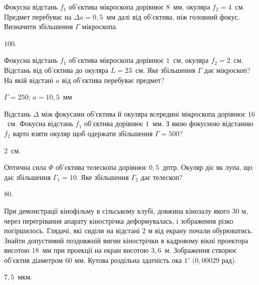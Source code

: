 \begin{problem}%
Фокусна відстань $f_1$ об'єктива мікроскопа дорівнює $8$~мм, окуляра $f_2 =
	4$~см. Предмет перебуває на $\Delta a = 0,5$~мм далі від об'єктива, ніж головний
фокус. Визначити збільшення $\Gamma$ мікроскопа.
\begin{solution}
	$100$.
\end{solution}
\end{problem}


\begin{problem}%
Фокусна відстань $f_1$ об'єктива мікроскопа дорівнює $1$~см, окуляра $f_2 =
	2$~см. Відстань від об'єктива до окуляра $L = 23$~см. Яке збільшення $\Gamma$ дає
мікроскоп? На якій відстані $a$ від об'єктива перебуває предмет?
\begin{solution}
	$\Gamma = 250$; $a = 10,5$~мм
\end{solution}
\end{problem}

\begin{problem}%
Відстань $\Delta$ між фокусами об'єктива й окуляра всередині мікроскопа
дорівнює $16$~см. Фокусна відстань $f_1$ об'єктива дорівнює $1$~мм. З якою
фокусною відстанню $f_2$ варто взяти окуляр щоб одержати збільшення $\Gamma  = 500$?
\begin{solution}
	$2$~см.
\end{solution}
\end{problem}

\begin{problem}%
Оптична сила $\Phi$ об'єктива телескопа дорівнює $0,5$~дптр. Окуляр діє
як лупа, що дає збільшення $\Gamma_1 = 10$. Яке збільшення $\Gamma_2$ дає телескоп?
\begin{solution}
	$80$.
\end{solution}
\end{problem}


\begin{problem}%
При демонстрації кінофільму в сільському клубі, довжина кінозалу
якого $30$ м, через перегрівання апарату кінострічка деформувалась, і
зображення різко погіршилось. Глядачі, які сиділи на відстані $2$ м від
екрану почали обурюватись. Знайти допустимий поздовжній вигин
кінострічки в кадровому вікні проектора висотою $18$~мм при проекції на
екран висотою $3,6$~м. Зображення створює об'єктив діаметром $60$ мм.
Кутова роздільна здатність ока $1'$ ($0,00029$ рад).
\begin{solution}
	$7,5$~мкм.
\end{solution}
\end{problem}

